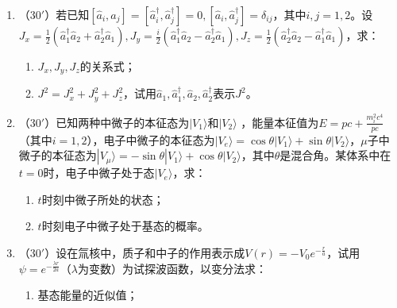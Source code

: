 \begin{enumerate}
\item 	
（$30'$）若已知$[\hat{a}_i,\hat{a}_j]=[\hat{a}_i^\dagger,\hat{a}_j^\dagger]=0,[\hat{a}_i,\hat{a}_j^\dagger]=\delta_{ij}$，其中$i,j=1,2$。设$J_x=\frac{1}{2}(\hat{a}^\dagger_1\hat{a}_2+\hat{a}^\dagger_2\hat{a}_1),J_y=\frac{i}{2}(\hat{a}^\dagger_1\hat{a}_2-\hat{a}^\dagger_2\hat{a}_1),J_z=\frac{1}{2}(\hat{a}^\dagger_2\hat{a}_2-\hat{a}^\dagger_1\hat{a}_1)$，求：
\begin{enumerate}
	\item
$J_x,J_y,J_z$的关系式；

\item 
$J^2=J_x^2+J_y^2+J_z^2$，试用$\hat{a}_1,\hat{a}^\dagger_1,\hat{a}_2,\hat{a}_2^\dagger$表示$J^2$。
\end{enumerate}

\banswer{
	
}


\newpage
\item 
（$30'$）已知两种中微子的本征态为$|V_1\rangle$和$|V_2\rangle$ ，能量本征值为$E=pc+\frac{m_i^2c^4}{pc}$（其中$i=1,2$），电子中微子的本征态为$|V_e\rangle=\cos\theta|V_1\rangle+\sin\theta|V_2\rangle$，$\mu$子中微子的本征态为$|V_\mu\rangle=-\sin\theta|V_1\rangle+\cos\theta|V_2\rangle$，其中$\theta$是混合角。某体系中在$t=0$时，电子中微子处于态$|V_e\rangle$，求：
\begin{enumerate}
	\item
$t$时刻中微子所处的状态；

\item 
$t$时刻电子中微子处于基态的概率。
	
\end{enumerate}


\banswer{
	
}


\item 
（$30'$）设在氚核中，质子和中子的作用表示成$V(r)=-V_0e^{-\frac{r}{a}}$，试用$\psi=e^{-\frac{\lambda r}{2a}}$（$\lambda$为变数）为试探波函数，以变分法求：
\begin{enumerate}
	\item
基态能量的近似值；


\end{enumerate}
\end{enumerate}
